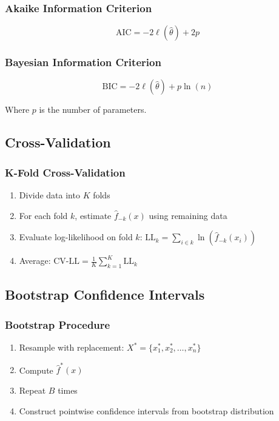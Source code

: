 \documentclass[12pt, xcolor=dvipsnames,svgnames,x11names]{article}
\begin{document}
\subsubsection{Akaike Information Criterion}
\begin{equation}
\text{AIC} = -2\ell(\hat{\theta}) + 2p
\end{equation}

\subsubsection{Bayesian Information Criterion}
\begin{equation}
\text{BIC} = -2\ell(\hat{\theta}) + p \ln(n)
\end{equation}

Where $p$ is the number of parameters.

\subsection{Cross-Validation}

\subsubsection{K-Fold Cross-Validation}
\begin{enumerate}
\item Divide data into $K$ folds
\item For each fold $k$, estimate $\hat{f}_{-k}(x)$ using remaining data
\item Evaluate log-likelihood on fold $k$: $\text{LL}_k = \sum_{i \in k} \ln(\hat{f}_{-k}(x_i))$
\item Average: $\text{CV-LL} = \frac{1}{K} \sum_{k=1}^K \text{LL}_k$
\end{enumerate}

\subsection{Bootstrap Confidence Intervals}

\subsubsection{Bootstrap Procedure}
\begin{enumerate}
\item Resample with replacement: $X^* = \{x_1^*, x_2^*, \ldots, x_n^*\}$
\item Compute $\hat{f}^*(x)$
\item Repeat $B$ times
\item Construct pointwise confidence intervals from bootstrap distribution
\end{enumerate}
\end{document}
